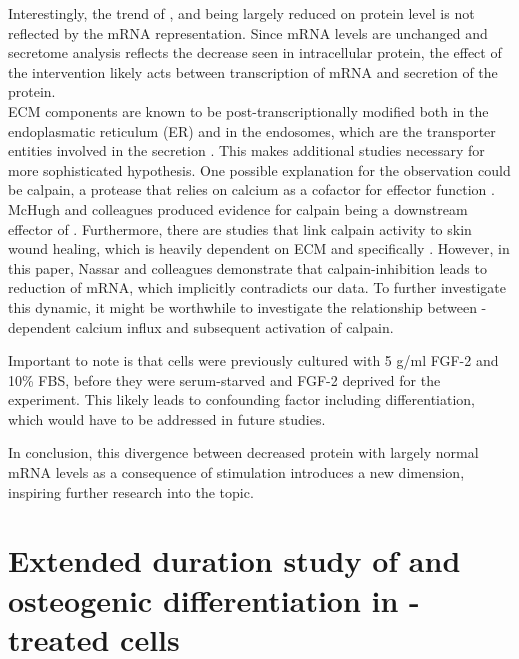 Interestingly, the trend of \colone{}, \colthree{} and \Fn{} being largely reduced on protein level is not reflected by the mRNA representation. Since mRNA levels are unchanged and secretome analysis reflects the decrease seen in intracellular protein, the effect of the intervention likely acts between transcription of mRNA and secretion of the protein. \\

ECM components are known to be post-transcriptionally modified both in the endoplasmatic reticulum (ER) and in the endosomes, which are the transporter entities involved in the secretion \cite{Ishida2011, Zeltz2014}. This makes additional studies necessary for more sophisticated hypothesis. One possible explanation for the observation could be calpain, a protease that relies on calcium as a cofactor for effector function \cite{Goll2003}. McHugh and colleagues produced evidence for calpain being a downstream effector of \Piezo{} \cite{McHugh2010}. Furthermore, there are studies that link calpain activity to skin wound healing, which is heavily dependent on ECM and specifically \colone{} \cite{Nassar2012}. However, in this paper, Nassar and colleagues demonstrate that calpain-inhibition leads to reduction of \colone{} mRNA, which implicitly contradicts our data. To further investigate this dynamic, it might be worthwhile to investigate the relationship between \Piezo{}-dependent calcium influx and subsequent activation of calpain. \par

Important to note is that cells were previously cultured with 5 \textmu{}g/ml FGF-2 and 10\% FBS, before they were serum-starved and FGF-2 deprived for the experiment. This likely leads to confounding factor including differentiation, which would have to be addressed in future studies.\par

In conclusion, this divergence between decreased protein with largely normal mRNA levels as a consequence of \Piezo{} stimulation introduces a new dimension, inspiring further research into the topic.


\section{Extended duration study of and osteogenic differentiation in \Yoda{}-treated cells}


